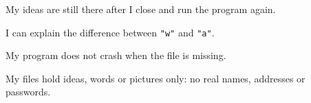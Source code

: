 \begin{selfcheck}
  \item My ideas are still there after I close and run the program again.
  \item I can explain the difference between \texttt{"w"} and \texttt{"a"}.
  \item My program does not crash when the file is missing.
  \item My files hold ideas, words or pictures only: no real names, addresses or passwords.
\end{selfcheck}
